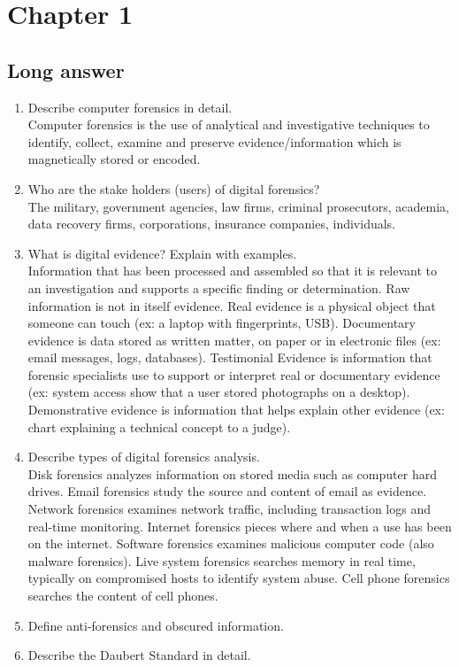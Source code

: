 \section{Chapter 1}
\subsection{Long answer}
\begin{enumerate}
    \item Describe computer forensics in detail.\\
    Computer forensics is the use of analytical and investigative techniques to identify, collect, examine and preserve evidence/information which is magnetically stored or encoded.
    \item Who are the stake holders (users) of digital forensics?\\
    The military, government agencies, law firms, criminal prosecutors, academia, data recovery firms, corporations, insurance companies, individuals.
    \item What is digital evidence? Explain with examples.\\
    Information that has been processed and assembled so that it is relevant to an investigation and supports a specific finding or determination.
    Raw information is not in itself evidence.
    Real evidence is a physical object that someone can touch (ex: a laptop with fingerprints, USB).
    Documentary evidence is data stored as written matter, on paper or in electronic files (ex: email messages, logs, databases).
    Testimonial Evidence is information that forensic specialists use to support or interpret real or documentary evidence (ex: system access show that a user stored photographs on a desktop).
    Demonstrative evidence is information that helps explain other evidence (ex: chart explaining a technical concept to a judge).
    \item Describe types of digital forensics analysis.\\
    Disk forensics analyzes information on stored media such as computer hard drives.
    Email forensics study the source and content of email as evidence.
    Network forensics examines network traffic, including transaction logs and real-time monitoring.
    Internet forensics pieces where and when a use has been on the internet.
    Software forensics examines malicious computer code (also malware forensics).
    Live system forensics searches memory in real time, typically on compromised hosts to identify system abuse.
    Cell phone forensics searches the content of cell phones.
    \item Define anti-forensics and obscured information.\\
    
    \item Describe the Daubert Standard in detail.
\end{enumerate}

